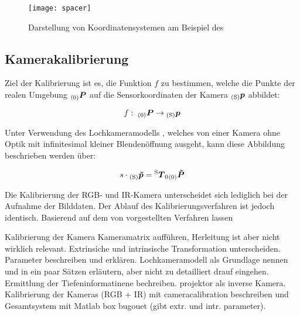 \begin{figure}[ht]
	\begin{center}
		\texttt{[image: spacer]}
		\caption{Darstellung von Koordinatensystemen am Beispiel des }
		\label{fig.coords}
	\end{center}
\end{figure}


\subsection{Kamerakalibrierung}
Ziel der Kalibrierung ist es, die Funktion $f$ zu bestimmen, welche die Punkte der realen Umgebung ${_{{\mathrm{(0)}}}}\mbox{\boldmath{$P$}}$ auf die Sensorkoordinaten der Kamera ${_{{\mathrm{(S)}}}}\mbox{\boldmath{$p$}}$ abbildet:

\begin{equation}
f : \; {_{{\mathrm{(0)}}}}\mbox{\boldmath{$P$}} \rightarrow {_{{\mathrm{(S)}}}}\mbox{\boldmath{$p$}}
\end{equation}

Unter Verwendung des Lochkameramodells , welches von einer Kamera ohne Optik mit infinitesimal kleiner Blendenöffnung ausgeht, kann diese Abbildung beschrieben werden über:

\begin{equation}
s \cdot {_{{\mathrm{(S)}}}}\mbox{\boldmath{$\tilde{p}$}} = {^{\mathrm{S}}\mbox{\boldmath{$T$}}_{\mathrm{0}}}{_{{\mathrm{(0)}}}}\mbox{\boldmath{$\tilde{P}$}}
\end{equation}

Die Kalibrierung der RGB- und IR-Kamera unterscheidet sich lediglich bei der Aufnahme der Bilddaten. Der Ablauf des Kalibrierungsverfahren ist jedoch identisch.
Basierend auf dem von  vorgestellten Verfahren lassen 

\red[Vereinfachung später, dass T-WELT = T-0]
Kalibrierung der Kamera
Kameramatrix aufführen, Herleitung ist aber nicht wirklich relevant. Extrinsiche und intrinsische Transformation unterscheiden. Parameter beschreiben und erklären. Lochkameramodell als Grundlage nennen und in ein paar Sätzen erläutern, aber nicht zu detailliert drauf eingehen. Ermittlung der Tiefeninformatinene bechreiben. projektor als inverse Kamera.\\
Kalibrierung der Kameras (RGB + IR) mit cameracalibration beschreiben und Gesamtsystem mit Matlab box bugouet (gibt extr. und intr. parameter). 

